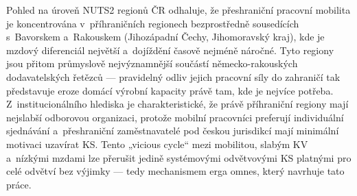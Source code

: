 Pohled na úroveň NUTS2 regionů ČR odhaluje, že přeshraniční pracovní mobilita je koncentrována v~příhraničních regionech bezprostředně sousedících s~Bavorskem a~Rakouskem (Jihozápadní Čechy, Jihomoravský kraj), kde je mzdový diferenciál největší a~dojíždění časově nejméně náročné.
Tyto regiony jsou přitom průmyslově nejvýznamnější součástí německo-rakouských dodavatelských řetězců --- pravidelný odliv jejich pracovní síly do zahraničí tak představuje eroze domácí výrobní kapacity právě tam, kde je nejvíce potřeba.
Z~institucionálního hlediska je charakteristické, že právě příhraniční regiony mají nejslabší odborovou organizaci, protože mobilní pracovníci preferují individuální sjednávání a~přeshraniční zaměstnavatelé pod českou jurisdikcí mají minimální motivaci uzavírat \ac{KS}.
Tento „vicious cycle“ mezi mobilitou, slabým \ac{KV} a~nízkými mzdami lze přerušit jedině systémovými odvětvovými \ac{KS} platnými pro celé odvětví bez výjimky --- tedy mechanismem erga omnes, který navrhuje tato práce.


